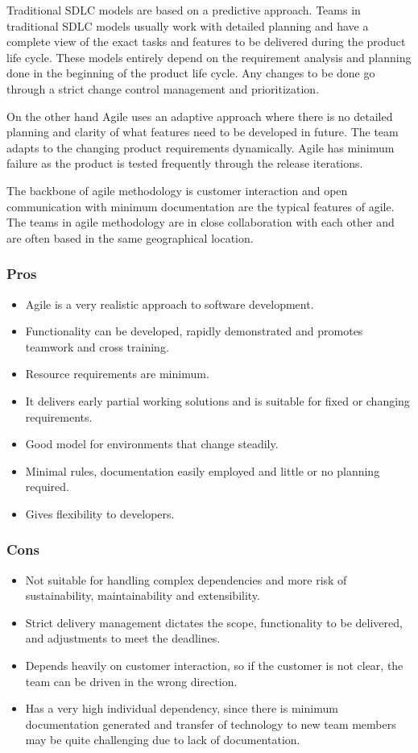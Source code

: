 Traditional SDLC models are based on a predictive approach. Teams in traditional SDLC models 
usually work with detailed planning and have a complete view of the exact tasks and features 
to be delivered during the product life cycle. These models entirely depend on the requirement 
analysis and planning done in the beginning of the product life cycle. Any changes to be done go 
through a strict change control management and prioritization.~\cite{agile}

On the other hand Agile uses an adaptive approach where there is no detailed planning and clarity
of what features need to be developed in future. The team adapts to the  changing product requirements 
dynamically. Agile has minimum failure as the product is tested frequently through the release iterations.

The backbone of agile methodology is customer interaction  and open communication with minimum 
documentation are the typical features of agile. The teams in agile methodology are in close collaboration 
with each other and are often based in the same geographical location.

\subsubsection{Pros}
\begin{itemize}
    \item Agile is a very realistic approach to software development.
    \item Functionality can be developed, rapidly demonstrated and promotes teamwork and cross training. 
    \item Resource requirements are minimum.
    \item It delivers early partial working solutions and is suitable for fixed or changing requirements.
    \item Good model for environments that change steadily.
    \item Minimal rules, documentation easily employed and little or no planning required.
    \item Gives flexibility to developers.
\end{itemize}

\subsubsection{Cons}
\begin{itemize}
    \item Not suitable for handling complex dependencies and more risk of sustainability, maintainability and extensibility.
    \item Strict delivery management dictates the scope, functionality to be delivered, and adjustments to meet the deadlines.
    \item Depends heavily on customer interaction, so if the customer is not clear, the team can be driven in the wrong direction.
    \item Has a very high individual dependency, since there is minimum documentation generated and transfer of technology to new 
    team members may be quite challenging due to lack of documentation.
\end{itemize}

